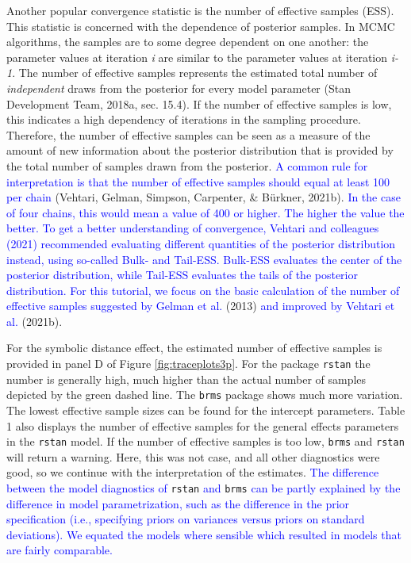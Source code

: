 \documentclass[
  english,
  doc,floatsintext]{apa6}
\begin{document}
Another popular convergence statistic is the number of effective samples (ESS). This statistic is concerned with the dependence of posterior samples. In MCMC algorithms, the samples are to some degree dependent on one another: the parameter values at iteration \emph{i} are similar to the parameter values at iteration \emph{i-1}. The number of effective samples represents the estimated total number of \emph{independent} draws from the posterior for every model parameter (Stan Development Team, 2018a, sec. 15.4). If the number of effective samples is low, this indicates a high dependency of iterations in the sampling procedure. Therefore, the number of effective samples can be seen as a measure of the amount of new information about the posterior distribution that is provided by the total number of samples drawn from the posterior. \textcolor{blue}{A common rule for interpretation is that the number of effective samples should equal at least 100 per chain} (Vehtari, Gelman, Simpson, Carpenter, \& Bürkner, 2021b). \textcolor{blue}{In the case of four chains, this would mean a value of 400 or higher. The higher the value the better. To get a better understanding of convergence, Vehtari and colleagues (2021) recommended evaluating different quantities of the posterior distribution instead, using so-called Bulk- and Tail-ESS. Bulk-ESS evaluates the center of the posterior distribution, while Tail-ESS evaluates the tails of the posterior distribution. For this tutorial, we focus on the basic calculation of the number of effective samples suggested by Gelman et al.} (2013) \textcolor{blue}{and improved by Vehtari et al.} (2021b).

For the symbolic distance effect, the estimated number of effective samples is provided in panel D of Figure \ref{fig:traceplots3p}. For the package \texttt{rstan} the number is generally high, much higher than the actual number of samples depicted by the green dashed line. The \texttt{brms} package shows much more variation. The lowest effective sample sizes can be found for the intercept parameters. Table 1 also displays the number of effective samples for the general effects parameters in the \texttt{rstan} model. If the number of effective samples is too low, \texttt{brms} and \texttt{rstan} will return a warning. Here, this was not case, and all other diagnostics were good, so we continue with the interpretation of the estimates. \textcolor{blue}{The difference between the model diagnostics of} \texttt{rstan} \textcolor{blue}{and} \texttt{brms} \textcolor{blue}{can be partly explained by the difference in model parametrization, such as the difference in the prior specification (i.e., specifying priors on variances versus priors on standard deviations). We equated the models where sensible which resulted in models that are fairly comparable. }
\end{document}
